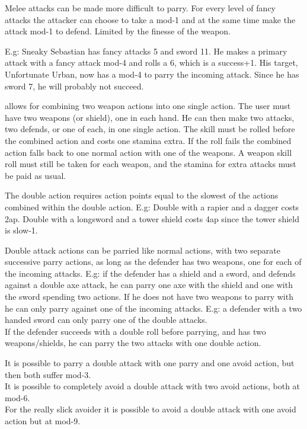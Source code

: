  Melee attacks can be made more difficult to parry. For every level of fancy attacks the attacker can choose to take a mod-1 and at the same time make the attack mod-1 to defend. Limited by the finesse of the weapon.

E.g: Sneaky Sebastian has fancy attacks 5 and sword 11. He makes a primary attack with a fancy attack mod-4 and rolls a 6, which is a success+1. His target, Unfortunate Urban, now has a mod-4 to parry the incoming attack. Since he has sword 7, he will probably not succeed.


 allows for combining two weapon actions into one single action. The user must have two weapons (or shield), one in each hand. He can then make two attacks, two defends, or one of each, in one single action. The skill must be rolled before the combined action and costs one stamina extra. If the roll fails the combined action falls back to one normal action with one of the weapons. A weapon skill roll must still be taken for each weapon, and the stamina for extra attacks must be paid as usual.

The double action requires action points equal to the slowest of the actions combined within the double action. E.g: Double with a rapier and a dagger costs 2ap. Double with a longsword and a tower shield costs 4ap since the tower shield is slow-1.

Double attack actions can be parried like normal actions, with two separate successive parry actions, as long as the defender has two weapons, one for each of the incoming attacks. E.g: if the defender has a shield and a sword, and defends against a double axe attack, he can parry one axe with the shield and one with the sword spending two actions. If he does not have two weapons to parry with he can only parry against one of the incoming attacks. E.g: a defender with a two handed sword can only parry one of the double attacks.\\
If the defender succeeds with a double roll before parrying, and has two weapons/shields, he can parry the two attacks with one double action.

It is possible to parry a double attack with one parry and one avoid action, but then both suffer mod-3.\\
It is possible to completely avoid a double attack with two avoid actions, both at mod-6.\\
For the really slick avoider it is possible to avoid a double attack with one avoid action but at mod-9.

